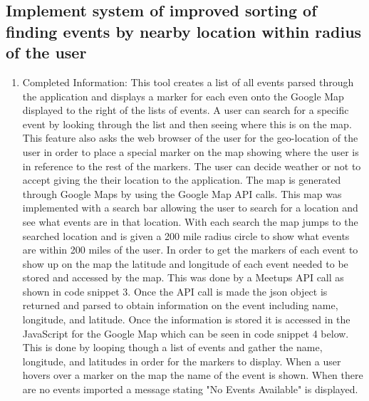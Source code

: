 \documentclass[draftclsnofoot,10pt,onecolumn]{IEEEtran} %
\begin{document}
\subsection{Implement system of improved sorting of finding events by nearby location within radius of the user}
\begin{enumerate}
  \item Completed Information: This tool creates a list of all events parsed through 
    the application and displays a marker for each even onto the Google Map displayed
    to the right of the lists of events. A user can search for a specific event by looking
    through the list and then seeing where this is on the map. This feature also asks the 
    web browser of the user for the geo-location of the user in order to place a special
    marker on the map showing where the user is in reference to the rest of the markers. The
    user can decide weather or not to accept giving the their location to the application. The map
    is generated through Google Maps by using the Google Map API calls. This map was implemented 
    with a search bar allowing the user to search for a location and see what events are in 
    that location. With each search the map jumps to the searched location and is given a 200 mile radius
    circle to show what events are within 200 miles of the user. In order to get the markers of
    each event to show up on the map the latitude and longitude of each event needed to be stored and
    accessed by the map. This was done by a Meetups API call as shown in code snippet 3. Once the API call
    is made the json object is returned and parsed to obtain information on the event including name,
    longitude, and latitude. Once the information is stored it is accessed in the JavaScript for the 
    Google Map which can be seen in code snippet 4 below. This is done by looping though a list of 
    events and gather the name, longitude, and
    latitudes in order for the markers to display. When a user hovers over a marker on the map the name of
    the event is shown.  When there are no events imported a message stating 
    "No Events Available" is displayed.

\end{enumerate}

\newpage
\end{document}
